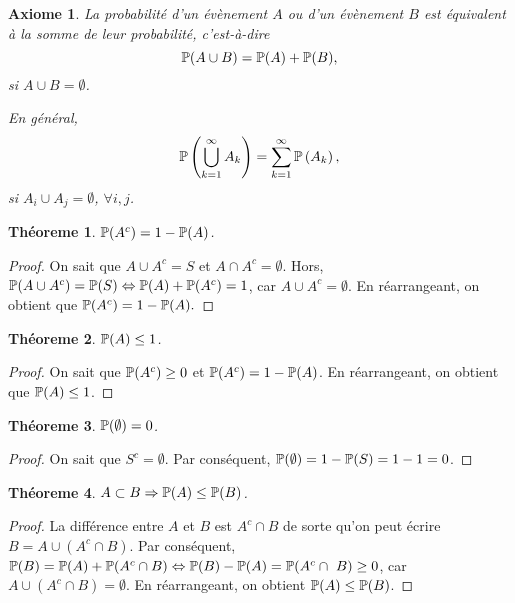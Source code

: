 \documentclass[11pt]{article}
\renewcommand\P{%
	\ensuremath{%
		\mathbb{P}%
	}%
}%
\newtheorem{axiome}{Axiome}
\newtheorem{theoreme}{Théoreme}[section]
\begin{document}
\begin{axiome}
	La probabilité d'un évènement $A$ ou d'un évènement $B$ est équivalent à la
	somme de leur probabilité, c'est-à-dire
	\begin{equation*}
		\P(A\cup B)=\P(A)+\P(B),
	\end{equation*}
	si $A\cup B=\emptyset$.

	En général, 
	\begin{equation*}
		\P\left(\bigcup_{k=1}^\infty A_k\right)=\sum_{k=1}^\infty \P\left(A_k\right),
	\end{equation*}
	si $A_i\cup A_j=\emptyset$, $\forall i,j$.
\end{axiome}

\begin{theoreme}
	$\P(A^c)=1-\P(A)$.
\end{theoreme}

\begin{proof}
	On sait que $A\cup A^c=S$ et $A\cap A^c=\emptyset$. Hors,
	$\P(A\cup A^c)=\P(S)\Leftrightarrow \P(A)+\P(A^c)=1$, car
	$A\cup A^c=\emptyset$.
	En réarrangeant, on obtient que $\P(A^c)=1-\P(A).$
\end{proof}

\begin{theoreme}
	$\P(A)\leq 1$.
\end{theoreme}

\begin{proof}
	On sait que $\P(A^c)\geq 0$ et $\P(A^c)=1-\P(A)$. En réarrangeant, on
	obtient que $\P(A)\leq 1$.
\end{proof}

\begin{theoreme}
	$\P(\emptyset)=0$.
\end{theoreme}

\begin{proof}
	On sait que $S^c=\emptyset$. Par conséquent, $\P(\emptyset)=1-\P(S)=1-1=0$.
\end{proof}

\begin{theoreme}
	$A\subset B\Rightarrow \P(A)\leq \P(B)$.
\end{theoreme}

\begin{proof}
	La différence entre $A$ et $B$ est $A^c\cap B$ de sorte qu'on peut écrire
	$B=A\cup(A^c\cap B)$. Par conséquent, $\P(B)=\P(A)+\P(A^c\cap B)
	\Leftrightarrow \P(B)-\P(A)=\P(A^c\cap B)\geq 0$, car
	$A\cup(A^c\cap B)=\emptyset$. En réarrangeant, on obtient $\P(A)\leq \P(B)$.
\end{proof}
\end{document}
